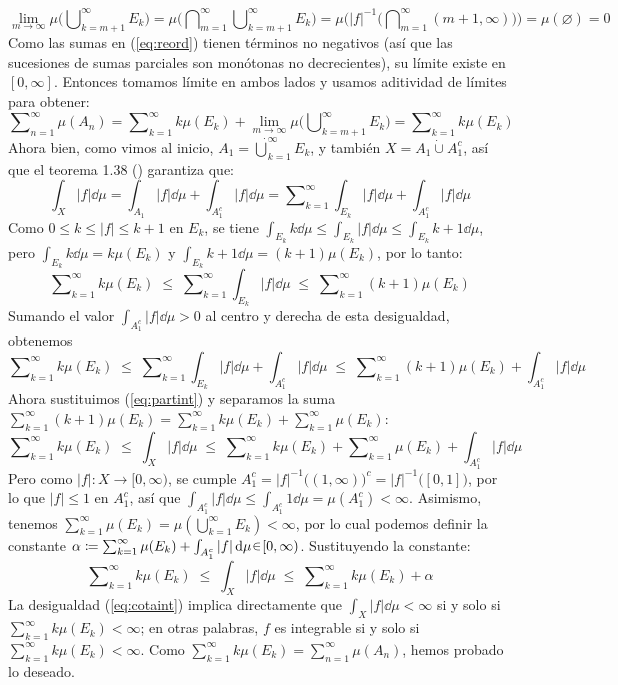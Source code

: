 \begin{sol}
\[
\lim_{m\to\infty}\mu\Big(\bigcup\nolimits^\infty_{k=m+1} E_k\Big)%
= \mu\Big( \bigcap\nolimits^\infty_{m=1}\bigcup\nolimits^\infty_{k=m+1} E_k \Big)%
= \mu\Big( |f|^{-1}\Big( \bigcap\nolimits^\infty_{m=1}(m+1,\infty) \Big) \Big)%
= \mu(\varnothing) = 0
\]
Como las sumas en (\ref{eq:reord}) tienen términos no negativos (así que las sucesiones de sumas parciales son monótonas no decrecientes), su límite existe en $[0,\infty]$. Entonces tomamos límite en ambos lados y usamos aditividad de límites para obtener:
\[
\sum\nolimits^\infty_{n=1}\mu(A_n)%
= \sum\nolimits^\infty_{k=1}k\mu(E_k) + \lim_{m\to\infty}\mu\Big(\bigcup\nolimits^\infty_{k=m+1} E_k\Big)%
= \sum\nolimits^\infty_{k=1}k\mu(E_k)
\]
Ahora bien, como vimos al inicio, $A_1 = \dot\bigcup^\infty_{k=1}E_k$, y también $X = A_1 \mathbin{\dot{\cup}} A^c_1$, así que el teorema 1.38 (\cite{Salamon}) garantiza que:
\begin{equation}\label{eq:partint}
\int_X|f|\dd{\mu}%
= \int_{A_1}|f|\dd{\mu} + \int_{A^c_1}|f|\dd{\mu}%
= \sum\nolimits^\infty_{k=1}\int_{E_k}|f|\dd{\mu} + \int_{A^c_1}|f|\dd{\mu}
\end{equation}
Como $0\leq k \leq |f| \leq k+1$ en $E_k$, se tiene $\int_{E_k}k\dd{\mu} \leq \int_{E_k}|f|\dd{\mu} \leq \int_{E_k}k+1\dd{\mu}$, pero $\int_{E_k}k\dd{\mu} = k\mu(E_k)$ y $\int_{E_k}k+1\dd{\mu} = (k+1)\mu(E_k)$, por lo tanto:
\[
\sum\nolimits^\infty_{k=1}k\mu(E_k) %
\;\leq\;%
\sum\nolimits^\infty_{k=1}\int_{E_k}|f|\dd{\mu}%
\;\leq\;%
\sum\nolimits^\infty_{k=1}(k+1)\mu(E_k)
\]
Sumando el valor $\int_{A^c_1}|f|\dd{\mu} > 0$ al centro y derecha de esta desigualdad, obtenemos
\[
\sum\nolimits^\infty_{k=1}k\mu(E_k) %
\;\leq\;%
\sum\nolimits^\infty_{k=1}\int_{E_k}|f|\dd{\mu} + \int_{A^c_1}|f|\dd{\mu}%
\;\leq\;%
\sum\nolimits^\infty_{k=1}(k+1)\mu(E_k) + \int_{A^c_1}|f|\dd{\mu}
\]
Ahora sustituimos (\ref{eq:partint}) y separamos la suma $\sum\nolimits^\infty_{k=1}(k+1)\mu(E_k) = \sum\nolimits^\infty_{k=1}k\mu(E_k) + \sum\nolimits^\infty_{k=1}\mu(E_k)$:
\[
\sum\nolimits^\infty_{k=1}k\mu(E_k) %
\;\leq\;%
\int_{X}|f|\dd{\mu}%
\;\leq\;%
\sum\nolimits^\infty_{k=1}k\mu(E_k) + \sum\nolimits^\infty_{k=1}\mu(E_k) + \int_{A^c_1}|f|\dd{\mu}
\]
Pero como $|f| \colon X \to [0,\infty)$, se cumple $A^c_1 = |f|^{-1}\big((1,\infty)\big)^c = |f|^{-1}\big([0,1]\big)$, por lo que $|f| \leq 1$ en $A^c_1$, así que $\int_{A^c_1}|f|\dd{\mu} \leq \int_{A^c_1}1\dd{\mu} = \mu(A^c_1) < \infty$. Asimismo, tenemos $\sum\nolimits^\infty_{k=1}\mu(E_k) = \mu(\bigcup^\infty_{k=1}E_k) < \infty$, por lo cual podemos definir la constante $\alpha \coloneq \sum\nolimits^\infty_{k=1}\mu(E_k) + \int_{A^c_1}|f|\dd{\mu} \en [0,\infty)$. Sustituyendo la constante:
\begin{equation}\label{eq:cotaint}
\sum\nolimits^\infty_{k=1}k\mu(E_k) %
\;\leq\;%
\int_{X}|f|\dd{\mu}%
\;\leq\;%
\sum\nolimits^\infty_{k=1}k\mu(E_k) + \alpha
\end{equation}
La desigualdad (\ref{eq:cotaint}) implica directamente que $\int_{X}|f|\dd{\mu} < \infty$ si y solo si $\sum^\infty_{k=1}k\mu(E_k) < \infty$; en otras palabras, $f$ es integrable si y solo si $\sum^\infty_{k=1}k\mu(E_k) < \infty$. Como $\sum^\infty_{k=1}k\mu(E_k) = \sum^\infty_{n=1}\mu(A_n)$, hemos probado lo deseado.
\end{sol}